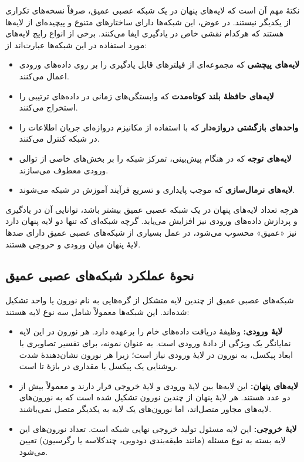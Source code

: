 نکتهٔ مهم آن است که لایه‌های پنهان در یک شبکه عصبی عمیق، صرفاً نسخه‌های تکراری از یکدیگر نیستند. در عوض، این شبکه‌ها دارای ساختارهای متنوع و پیچیده‌ای از لایه‌ها هستند که هرکدام نقشی خاص در یادگیری ایفا می‌کنند. برخی از انواع رایج لایه‌های مورد استفاده در این شبکه‌ها عبارت‌اند از:

\begin{itemize}
	\item \textbf{لایه‌های پیچشی} که مجموعه‌ای از فیلترهای قابل یادگیری را بر روی داده‌های ورودی اعمال می‌کنند.
	\item \textbf{لایه‌های حافظهٔ بلند کوتاه‌مدت} که وابستگی‌های زمانی در داده‌های ترتیبی را استخراج می‌کنند.
	\item \textbf{واحدهای بازگشتی دروازه‌دار} که با استفاده از مکانیزم دروازه‌ای جریان اطلاعات را در شبکه کنترل می‌کنند.
	\item \textbf{لایه‌های توجه} که در هنگام پیش‌بینی، تمرکز شبکه را بر بخش‌های خاصی از توالی ورودی معطوف می‌سازند.
	\item \textbf{لایه‌های نرمال‌سازی} که موجب پایداری و تسریع فرآیند آموزش در شبکه می‌شوند.
\end{itemize}

هرچه تعداد لایه‌های پنهان در یک شبکه عصبی عمیق بیشتر باشد، توانایی آن در یادگیری و پردازش داده‌های ورودی نیز افزایش می‌یابد. گرچه شبکه‌ای که تنها دو لایه پنهان دارد نیز «عمیق» محسوب می‌شود، در عمل بسیاری از شبکه‌های عصبی عمیق دارای صدها لایهٔ پنهان میان ورودی و خروجی هستند.


\subsection*{نحوهٔ عملکرد شبکه‌های عصبی عمیق}

شبکه‌های عصبی عمیق از چندین لایه متشکل از گره‌هایی به نام نورون‌ یا واحد تشکیل شده‌اند. این شبکه‌ها معمولاً شامل سه نوع لایه هستند:

\begin{itemize}
	\item \textbf{لایهٔ ورودی:} وظیفهٔ دریافت داده‌های خام را برعهده دارد. هر نورون در این لایه نمایانگر یک ویژگی از دادهٔ ورودی است. به عنوان نمونه، برای تفسیر تصاویری با ابعاد  پیکسل، به  نورون در لایهٔ ورودی نیاز است؛ زیرا هر نورون نشان‌دهندهٔ شدت روشنایی یک پیکسل با مقداری در بازهٔ  تا  است.
	
	\item \textbf{لایه‌های پنهان:} این لایه‌ها بین لایهٔ ورودی و لایهٔ خروجی قرار دارند و معمولاً بیش از دو عدد هستند. هر لایهٔ پنهان از چندین نورون تشکیل شده است که به نورون‌های لایه‌های مجاور متصل‌اند، اما نورون‌های یک لایه به یکدیگر متصل نمی‌باشند.
	
	\item \textbf{لایهٔ خروجی:} این لایه مسئول تولید خروجی نهایی شبکه است. تعداد نورون‌های این لایه بسته به نوع مسئله (مانند طبقه‌بندی دودویی، چندکلاسه یا رگرسیون) تعیین می‌شود.
\end{itemize}

